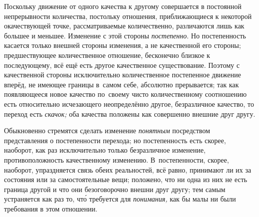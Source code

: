 Поскольку движение от одного качества к другому совершается в постоянной
непрерывности количества, постольку отношения, приближающиеся к некоторой
окачествующей точке, рассматриваемые количественно, различаются лишь как
большее и меньшее. Изменение с этой стороны {\em постепенно}. Но постепенность
касается только внешней стороны изменения, а не качественной его стороны;
предшествующее количественное отношение, бесконечно близкое к последующему,
всё ещё есть другое качественное существование. Поэтому с качественной стороны
исключительно количественное постепенное движение вперёд, не имеющее границы
в~самом себе, абсолютно прерывается; так как появляющееся новое качество
по~своему чисто количественному соотношению есть относительно исчезающего
неопределённо другое, безразличное качество, то переход есть {\em скачок;}
оба качества положены как совершенно внешние друг другу.

Обыкновенно стремятся сделать изменение {\em понятным} посредством
представления о постепенности перехода; но постепенность есть скорее, наоборот,
как раз исключительно только безразличное изменение, противоположность
качественному изменению. В~постепенности, скорее, наоборот, упраздняется связь
обеих реальностей, всё равно, принимают ли их за состояния или за
самостоятельные вещи; положено, что ни одна из них не есть граница другой и что
они безоговорочно внешни друг другу; тем самым устраняется как раз то, чт\'{о}
требуется для {\em понимания,} как бы малы ни были требования в этом отношении.


